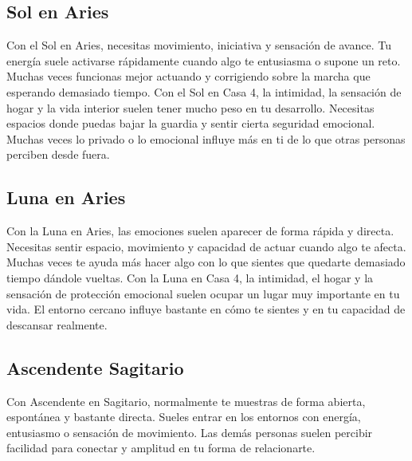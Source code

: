 \documentclass[11pt,a4paper]{article}
\begin{document}
\subsection{Sol en Aries}

Con el Sol en Aries, necesitas movimiento, iniciativa y sensación de avance. Tu energía suele activarse rápidamente cuando algo te entusiasma o supone un reto. Muchas veces funcionas mejor actuando y corrigiendo sobre la marcha que esperando demasiado tiempo. Con el Sol en Casa 4, la intimidad, la sensación de hogar y la vida interior suelen tener mucho peso en tu desarrollo. Necesitas espacios donde puedas bajar la guardia y sentir cierta seguridad emocional. Muchas veces lo privado o lo emocional influye más en ti de lo que otras personas perciben desde fuera.

\vspace{0.8cm}

\subsection{Luna en Aries}

Con la Luna en Aries, las emociones suelen aparecer de forma rápida y directa. Necesitas sentir espacio, movimiento y capacidad de actuar cuando algo te afecta. Muchas veces te ayuda más hacer algo con lo que sientes que quedarte demasiado tiempo dándole vueltas. Con la Luna en Casa 4, la intimidad, el hogar y la sensación de protección emocional suelen ocupar un lugar muy importante en tu vida. El entorno cercano influye bastante en cómo te sientes y en tu capacidad de descansar realmente.

\vspace{0.8cm}

\subsection{Ascendente Sagitario}

Con Ascendente en Sagitario, normalmente te muestras de forma abierta, espontánea y bastante directa. Sueles entrar en los entornos con energía, entusiasmo o sensación de movimiento. Las demás personas suelen percibir facilidad para conectar y amplitud en tu forma de relacionarte.

\vspace{0.8cm}
\end{document}
